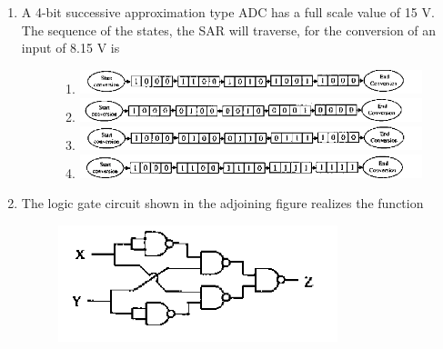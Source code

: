 \documentclass[journal,12pt,onecolumn]{IEEEtran}
\theoremstyle{remark}
\begin{document}
\begin{enumerate}
\item A 4-bit successive approximation type ADC has a full scale value of 15 V. The sequence of the states, the SAR will traverse, for the conversion of an input of 8.15 V is

\hfill{}
\begin{figure}[H]
    \centering
    \begin{enumerate} 
    \item \caption*{} \label{fig:placeholder}\includegraphics[scale = 0.75]{41a}
    \item \caption*{} \label{fig:placeholder}\includegraphics[scale = 0.75]{41b}
    \item \caption*{} \label{fig:placeholder}\includegraphics[scale = 0.75]{41c}
    \item \caption*{} \label{fig:placeholder}\includegraphics[scale = 0.75]{41d}
 \end{enumerate}
\end{figure}

\vspace{0.5cm}
\newpage

\item The logic gate circuit shown in the adjoining figure realizes the function
\begin{figure}[H]
\newpage
    \centering
    \includegraphics[scale=0.75]{q42}
    \caption*{}
    \label{fig:placeholder}
\end{figure}

\hfill{}\begin{enumerate}  \end{enumerate}


\end{enumerate}
\end{document}
